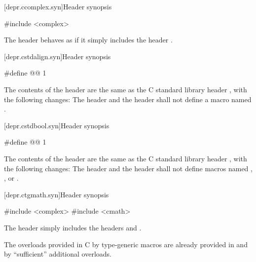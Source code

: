 [depr.ccomplex.syn]{Header  synopsis}
%

\begin{codeblock}
#include <complex>
\end{codeblock}

\pnum
The header 
behaves as if it simply includes the header
.

[depr.cstdalign.syn]{Header  synopsis}

%
%
\begin{codeblock}
#define @@ 1
\end{codeblock}

\pnum
{}%
%
The contents of the header  are the same as the C
standard library header , with the following changes:
The header  and the header  shall not
define a macro named .


[depr.cstdbool.syn]{Header  synopsis}

%
%
\begin{codeblock}
#define @@ 1
\end{codeblock}

\pnum
{}%
The contents of the header  are the same as the C
standard library header , with the following changes:
The header  and the header  shall not
define macros named , , or .


[depr.ctgmath.syn]{Header  synopsis}

%
\begin{codeblock}
#include <complex>
#include <cmath>
\end{codeblock}

\pnum
The header  simply includes the headers
and .

\pnum
\begin{note} The overloads provided in C by type-generic macros are already
provided in  and  by ``sufficient'' additional
overloads.\end{note}

